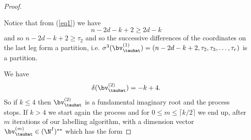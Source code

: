 \begin{proof}
\begin{center}
	\end{center}
	
	
	Notice that from (\ref{eq1}) we have
	$$
	n-2d-k+2\geq 2d-k
	$$
	and so $n-2d-k+2\geq \tau_2$ and so the successive differences of the coordinates on the last leg form a partition, i.e. $\sigma^3(\bv^{(1)}_\tauhat)=(n-2d-k+2,\tau_2,\tau_3,\ldots , \tau_r)$ is a partition.
	
	We have
	$$
	\delta(\bv^{(2)}_\tauhat)=-k+4.
	$$
	So if $k\leq 4$ then $\bv^{(2)}_\tauhat$ is a fundamental imaginary root and the process stops. If $k>4$ we start again the process and for $0\leq m\leq \lceil k/2\rceil$ we end up, after $m$ iterations of our labelling algorithm,  with a dimension vector $\bv_\tauhat^{(m)}\in(\N^I)^{**}$ which has the form
	

\end{proof}
